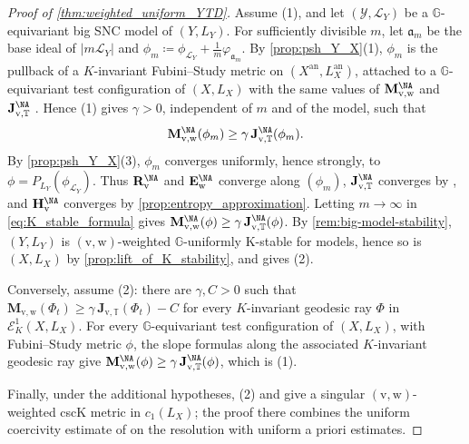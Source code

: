 \documentclass[11pt,a4paper]{article}
\newcommand{\an}{\mathrm{an}}          %
\begin{document}
\begin{proof}[Proof of \cref{thm:weighted_uniform_YTD}]
Assume (1), and let $(\mathcal{Y},\mathcal{L}_Y)$ be a $\mathbb{G}$-equivariant big SNC model of $(Y,L_Y)$. For sufficiently divisible $m$, let $\mathfrak{a}_m$ be the base ideal of $|m\mathcal{L}_Y|$ and $\phi_m\coloneqq\phi_{\mathcal{L}_Y}+\frac1m\varphi_{\mathfrak{a}_m}$. By \cref{prop:psh_Y_X}(1), $\phi_m$ is the pullback of a $K$-invariant Fubini--Study metric on $(X^{\an},L_X^{\an})$, attached to a $\mathbb{G}$-equivariant test configuration of $(X,L_X)$ with the same values of $\mathbf{M}^{\NA}_{\mathrm{v},\mathrm{w}}$ and $\mathbf{J}^{\NA}_{\mathrm{v},\mathbb{T}}$ \cite[Proposition~4.3]{HL25}. Hence (1) gives $\gamma>0$, independent of $m$ and of the model, such that
\begin{equation}\label{eq:K_stable_formula}
 \mathbf{M}^{\NA}_{\mathrm{v},\mathrm{w}}(\phi_m)\geq\gamma\,\mathbf{J}^{\NA}_{\mathrm{v},\mathbb{T}}(\phi_m).
\end{equation}
By \cref{prop:psh_Y_X}(3), $\phi_m$ converges uniformly, hence strongly, to $\phi=P_{L_Y}(\phi_{\mathcal{L}_Y})$. Thus $\mathbf{R}^{\NA}_{\mathrm{v}}$ and $\mathbf{E}^{\NA}_{\mathrm{w}}$ converge along $(\phi_m)$, $\mathbf{J}^{\NA}_{\mathrm{v},\mathbb{T}}$ converges by \cite[Lemma~3.10]{HL25}, and $\mathbf{H}^{\NA}_{\mathrm{v}}$ converges by \cref{prop:entropy_approximation}. Letting $m\to\infty$ in \eqref{eq:K_stable_formula} gives $\mathbf{M}^{\NA}_{\mathrm{v},\mathrm{w}}(\phi)\geq\gamma\,\mathbf{J}^{\NA}_{\mathrm{v},\mathbb{T}}(\phi)$. By \cref{rem:big-model-stability}, $(Y,L_Y)$ is $(\mathrm{v},\mathrm{w})$-weighted $\mathbb{G}$-uniformly K-stable for models, hence so is $(X,L_X)$ by \cref{prop:lift_of_K_stability}, and \cite[Theorem~1.2]{HL25} gives (2).

Conversely, assume (2): there are $\gamma,C>0$ such that $\mathbf{M}_{\mathrm{v},\mathrm{w}}(\Phi_t)\geq\gamma\,\mathbf{J}_{\mathrm{v},\mathbb{T}}(\Phi_t)-C$ for every $K$-invariant geodesic ray $\Phi$ in $\mathcal{E}^1_K(X,L_X)$. For every $\mathbb{G}$-equivariant test configuration of $(X,L_X)$, with Fubini--Study metric $\phi$, the slope formulas \cite[Lemma~3.9, Corollary~3.31]{HL25} along the associated $K$-invariant geodesic ray give $\mathbf{M}^{\NA}_{\mathrm{v},\mathrm{w}}(\phi)\geq\gamma\,\mathbf{J}^{\NA}_{\mathrm{v},\mathbb{T}}(\phi)$, which is (1).

Finally, under the additional hypotheses, (2) and \cite[Theorem~A]{PT26} give a singular $(\mathrm{v},\mathrm{w})$-weighted cscK metric in $c_1(L_X)$; the proof there combines the uniform coercivity estimate of \cite[Theorem~A]{BJT26} on the resolution with uniform a priori estimates.
\end{proof}
\end{document}
